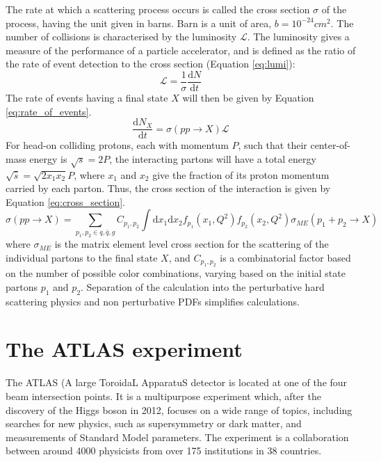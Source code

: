 \documentclass[11pt,a4paper,openright,twoside]{report}
\begin{document}
The rate at which a scattering process occurs is called the cross section $\sigma$ of the process, having the unit given in barns. Barn is a unit of area, $b = 10^{-24}cm^2$. The number of collisions is characterised by the luminosity $\mathcal{L}$. The luminosity gives a measure of the performance of a particle accelerator, and is defined as the ratio of the rate of event detection to the cross section (Equation \ref{eq:lumi}):
\begin{equation}
\mathcal{L} = \frac{1}{\sigma}\frac{\text{d}N}{\text{d}t}
\label{eq:lumi}
\end{equation}
The rate of events having a final state $X$ will then be given by Equation \ref{eq:rate_of_events}.
\begin{equation}
\frac{\text{d}N_X}{\text{d}t} = \sigma(pp\to X)\mathcal{L}
\label{eq:rate_of_events}
\end{equation}
For head-on colliding protons, each with momentum $P$, such that their center-of-mass energy is $\sqrt{s}=2P$, the interacting partons will have a total energy $\sqrt{\hat{s}}=\sqrt{2x_1x_2}P$, where $x_1$ and $x_2$ give the fraction of its proton momentum carried by each parton. Thus, the cross section of the interaction is given by Equation \ref{eq:cross_section}.
\begin{equation}
\sigma(pp\to X) = \sum_{p_1,p_2\in q,\bar{q},g} C_{p_1,p_2}\int\text{d}x_1\text{d}x_2 f_{p_1}(x_1,Q^2)f_{p_2}(x_2,Q^2)\sigma_{ME}(p_1+p_2\to X)
\label{eq:cross_section}
\end{equation}
where $\sigma_{ME}$ is the matrix element level cross section for the scattering of the individual partons to the final state $X$, and $C_{p_1,p_2}$ is a combinatorial factor based on the number of possible color combinations, varying based on the initial state partons $p_1$ and $p_2$. Separation of the calculation into the perturbative hard scattering physics and non perturbative PDFs simplifies calculations.

\section{The ATLAS experiment}
The ATLAS (A large ToroidaL ApparatuS detector is located at one of the four beam intersection points. It is a multipurpose experiment which, after the discovery of the Higgs boson in 2012, focuses on a wide range of topics, including searches for new physics, such as supersymmetry or dark matter, and measurements of Standard Model parameters. The experiment is a collaboration between around 4000 physicists from over 175 institutions in 38 countries.
\end{document}
